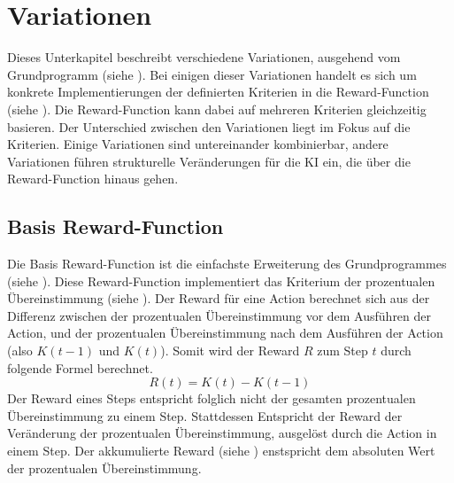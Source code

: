\section{Variationen}\label{chap:m_var}
Dieses Unterkapitel beschreibt verschiedene Variationen, ausgehend vom
Grundprogramm (siehe ). Bei einigen dieser Variationen
handelt es sich um konkrete Implementierungen der definierten Kriterien in die
Reward-Function (siehe ). Die Reward-Function kann
dabei auf mehreren Kriterien gleichzeitig basieren. Der Unterschied zwischen den
Variationen liegt im Fokus auf die Kriterien. Einige Variationen sind
untereinander kombinierbar, andere Variationen führen strukturelle Veränderungen
für die KI ein, die über die Reward-Function hinaus gehen.

\subsection{Basis Reward-Function}\label{sub:m_var_base}
Die Basis Reward-Function ist die einfachste Erweiterung des Grundprogrammes
(siehe ). Diese Reward-Function implementiert das
Kriterium der prozentualen Übereinstimmung (siehe ).
Der Reward für eine Action berechnet sich aus der Differenz zwischen der
prozentualen Übereinstimmung vor dem Ausführen der Action, und der prozentualen
Übereinstimmung nach dem Ausführen der Action (also $K(t-1)$ und $K(t)$). Somit
wird der Reward $R$ zum Step $t$ durch folgende Formel berechnet. 
\[ R(t) = K(t) - K(t-1) \] Der Reward eines Steps entspricht folglich nicht der
gesamten prozentualen Übereinstimmung zu einem Step. Stattdessen Entspricht der
Reward der Veränderung der prozentualen Übereinstimmung, ausgelöst durch die
Action in einem Step. Der akkumulierte Reward (siehe )
enstspricht dem absoluten Wert der prozentualen Übereinstimmung.


